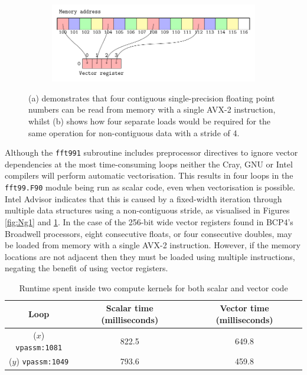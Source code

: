 \documentclass[a4paper,11pt]{report}
\begin{document}
\begin{figure}[htbp]\ContinuedFloat

\begin{subfigure}[b]{1\textwidth}
\centering
   \includegraphics[width=0.9\linewidth]{img/tikz-img/vector_registers_noncontiguous/vector_registers.pdf}
   \caption{}
   \label{fig:Ng2}
\end{subfigure}

\caption[Contiguous and non-contiguous memory access]{ (a) demonstrates that four contiguous single-precision floating point numbers can be read from memory with a single AVX-2 instruction, whilst (b) shows how four separate loads would be required for the same operation for non-contiguous data with a stride of 4.}
\label{fig:vector-registers} 
\end{figure}
\par
Although the \texttt{fft991} subroutine includes preprocessor directives to ignore vector dependencies at the most time-consuming loops neither the Cray, GNU or Intel compilers will perform automatic vectorisation. This results in four loops in the \texttt{fft99.F90} module being run as scalar code, even when vectorisation is possible. Intel Advisor indicates that this is caused by a fixed-width iteration through multiple data structures using a non-contiguous stride, as visualised in Figures \ref{fig:Ng1} and \ref{fig:Ng2}. In the case of the 256-bit wide vector registers found in BCP4's Broadwell processors, eight consecutive floats, or four consecutive doubles, may be loaded from memory with a single AVX-2 instruction. However, if the memory locations are not adjacent then they must be loaded using multiple instructions, negating the benefit of using vector registers. 
\par
\begin{table}[htp]
\caption{Runtime spent inside two compute kernels for both scalar and vector code}
\begin{center}
\begin{tabular}{ c c c }
\toprule 		
Loop						&	Scalar time (milliseconds)	&	Vector time (milliseconds)	\\ 
\midrule
($x$) \texttt{vpassm:1081}		&	822.5				&	649.8				\\
($y$) \texttt{vpassm:1049}		&	793.6				&	459.8				\\
\bottomrule
\end{tabular}
\end{center}
\label{tbl:force-vec}
\end{table}
\end{document}
